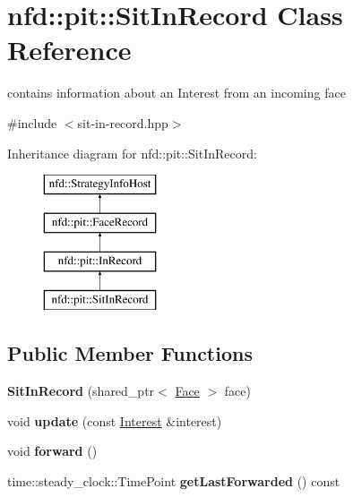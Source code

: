 \hypertarget{classnfd_1_1pit_1_1SitInRecord}{}\section{nfd\+:\+:pit\+:\+:Sit\+In\+Record Class Reference}
\label{classnfd_1_1pit_1_1SitInRecord}


contains information about an Interest from an incoming face  




{\ttfamily \#include $<$sit-\/in-\/record.\+hpp$>$}

Inheritance diagram for nfd\+:\+:pit\+:\+:Sit\+In\+Record\+:\begin{figure}[H]
\begin{center}
\leavevmode
\includegraphics[height=4.000000cm]{classnfd_1_1pit_1_1SitInRecord}
\end{center}
\end{figure}
\subsection*{Public Member Functions}
\begin{DoxyCompactItemize}
\item 
{\bfseries Sit\+In\+Record} (shared\+\_\+ptr$<$ \hyperlink{classnfd_1_1Face}{Face} $>$ face)\hypertarget{classnfd_1_1pit_1_1SitInRecord_a92c8882d238b0a3363f79e1dc0ba8c81}{}\label{classnfd_1_1pit_1_1SitInRecord_a92c8882d238b0a3363f79e1dc0ba8c81}

\item 
void {\bfseries update} (const \hyperlink{classndn_1_1Interest}{Interest} \&interest)\hypertarget{classnfd_1_1pit_1_1SitInRecord_a29b857d0999a867683d7c7615f192193}{}\label{classnfd_1_1pit_1_1SitInRecord_a29b857d0999a867683d7c7615f192193}

\item 
void {\bfseries forward} ()\hypertarget{classnfd_1_1pit_1_1SitInRecord_a9e9170fa6ad17329e45ec6611ddcf0ce}{}\label{classnfd_1_1pit_1_1SitInRecord_a9e9170fa6ad17329e45ec6611ddcf0ce}

\item 
time\+::steady\+\_\+clock\+::\+Time\+Point {\bfseries get\+Last\+Forwarded} () const\hypertarget{classnfd_1_1pit_1_1SitInRecord_afc4007439a1102fbaebd4117262e38d6}{}\label{classnfd_1_1pit_1_1SitInRecord_afc4007439a1102fbaebd4117262e38d6}

\end{DoxyCompactItemize}
